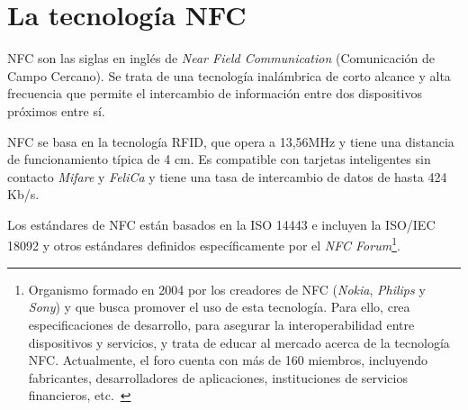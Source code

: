 


  \section{La tecnología \acs{NFC}}
\acs{NFC} son las siglas en inglés de \emph{Near Field Communication}
(Comunicación de Campo Cercano). Se trata de una tecnología inalámbrica de
corto alcance y alta frecuencia que permite el intercambio de información
entre dos dispositivos próximos entre sí.

\acs{NFC} se basa en la tecnología \acs{RFID}, que opera a 13,56MHz y tiene
una distancia de funcionamiento típica de 4 cm. Es compatible con tarjetas
inteligentes sin contacto \emph{Mifare} y \emph{FeliCa} y tiene una tasa de
intercambio de datos de hasta 424 Kb/s.

Los estándares de \acs{NFC} están basados en la \acs{ISO} 14443 e incluyen
la \acs{ISO}/\acs{IEC} 18092 y otros estándares definidos específicamente por
el \emph{NFC Forum}\footnote{Organismo formado en 2004 por los creadores de
\acs{NFC} (\emph{Nokia}, \emph{Philips} y \emph{Sony}) y que busca promover
el uso de esta tecnología. Para ello, crea especificaciones de desarrollo,
para asegurar la interoperabilidad entre dispositivos y servicios, y trata
de educar al mercado acerca de la tecnología \acs{NFC}. Actualmente, el foro
cuenta con más de 160 miembros, incluyendo fabricantes, desarrolladores de
aplicaciones, instituciones de servicios financieros, etc.~\cite{bib:nfcForum}}.

